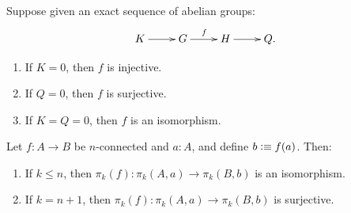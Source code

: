 \documentclass[hott-all.tex]{subfiles}
\begin{document}
% 
\begin{lem}
  Suppose given an exact sequence of abelian groups:
  \[\xymatrix{K \ar[r]& G \ar^f[r] & H \ar[r] & Q.}\]
  \begin{enumerate}
  \item If $K=0$, then $f$ is injective.
  \item If $Q=0$, then $f$ is surjective.
  \item If $K=Q=0$, then $f$ is an isomorphism.
  \end{enumerate}
\end{lem}
% 
% 
\begin{cor}
  Let $f:A\to B$ be $n$-connected and $a:A$, and define $b\vcentcolon\equiv f(a)$.  Then:
  \begin{enumerate}
  \item If $k\le n$, then $\pi_k(f):\pi_k(A,a) \to \pi_k(B,b)$ is an isomorphism.
  \item If $k=n+1$, then $\pi_k(f):\pi_k(A,a) \to \pi_k(B,b)$ is surjective.
  \end{enumerate}
\end{cor}
% 
% 
% 
\end{document}

